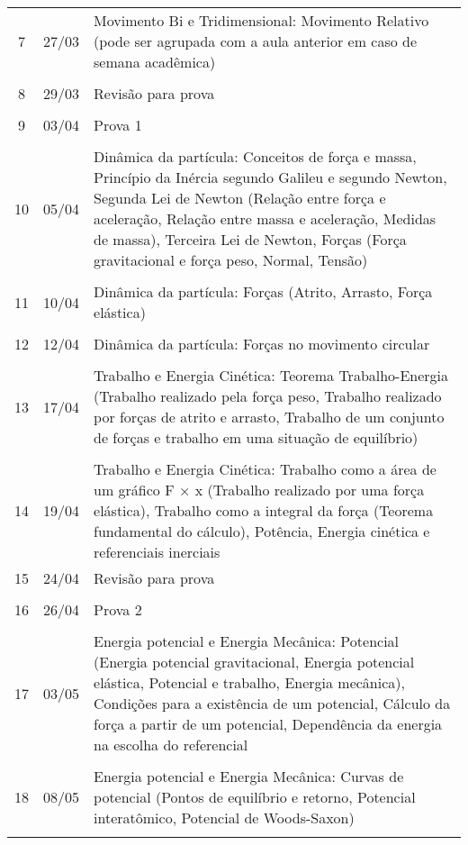 \begin{center}
\begin{longtable}{ccp{70mm}}
7 & 27/03 & Movimento Bi e Tridimensional: Movimento Relativo (pode ser agrupada com a aula anterior em caso de semana acadêmica) \\
\\
8 & 29/03 & Revisão para prova \\
\\
9 & 03/04 & Prova 1 \\
\\
10 & 05/04 & Dinâmica da partícula: Conceitos de força e massa, Princípio da Inércia segundo Galileu e segundo Newton, Segunda Lei de Newton (Relação entre força e aceleração, Relação entre massa e aceleração, Medidas de massa), Terceira Lei de Newton, Forças (Força gravitacional e força peso, Normal, Tensão) \\
\\
11 & 10/04 & Dinâmica da partícula: Forças (Atrito, Arrasto, Força elástica) \\
\\
12 & 12/04 & Dinâmica da partícula: Forças no movimento circular \\
\\
13 & 17/04 & Trabalho e Energia Cinética: Teorema Trabalho-Energia (Trabalho realizado pela força peso, Trabalho realizado por forças de atrito e arrasto, Trabalho de um conjunto de forças e trabalho em uma situação de equilíbrio) \\
\\
14 & 19/04 & Trabalho e Energia Cinética: Trabalho como a área de um gráfico F × x (Trabalho realizado por uma força elástica), Trabalho como a integral da força (Teorema fundamental do cálculo), Potência, Energia cinética e referenciais inerciais \\
15 & 24/04 & Revisão para prova \\
\\
16 & 26/04 & Prova 2 \\
\\
17 & 03/05 & Energia potencial e Energia Mecânica: Potencial (Energia potencial gravitacional, Energia potencial elástica, Potencial e trabalho, Energia mecânica), Condições para a existência de um potencial, Cálculo da força a partir de um potencial, Dependência da energia na escolha do referencial \\
\\
18 & 08/05 & Energia potencial e Energia Mecânica: Curvas de potencial (Pontos de equilíbrio e retorno, Potencial interatômico, Potencial de Woods-Saxon) \\
\\

\end{longtable}
\end{center}
